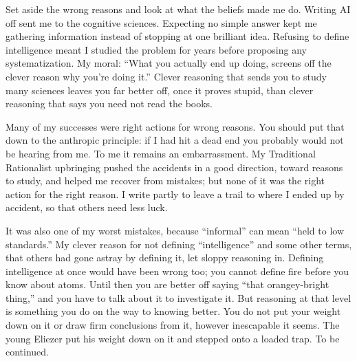 Set aside the wrong reasons and look at what the beliefs made me do. Writing AI off sent me to the cognitive sciences. Expecting no simple answer kept me gathering information instead of stopping at one brilliant idea. Refusing to define intelligence meant I studied the problem for years before proposing any systematization. My moral: ``What you actually end up doing, screens off the clever reason why you're doing it.'' Clever reasoning that sends you to study many sciences leaves you far better off, once it proves stupid, than clever reasoning that says you need not read the books.

Many of my successes were right actions for wrong reasons. You should put that down to the anthropic principle: if I had hit a dead end you probably would not be hearing from me. To me it remains an embarrassment. My Traditional Rationalist upbringing pushed the accidents in a good direction, toward reasons to study, and helped me recover from mistakes; but none of it was the right action for the right reason. I write partly to leave a trail to where I ended up by accident, so that others need less luck.

It was also one of my worst mistakes, because ``informal'' can mean ``held to low standards.'' My clever reason for not defining ``intelligence'' and some other terms, that others had gone astray by defining it, let sloppy reasoning in. Defining intelligence at once would have been wrong too; you cannot define fire before you know about atoms. Until then you are better off saying ``that orangey-bright thing,'' and you have to talk about it to investigate it. But reasoning at that level is something you do on the way to knowing better. You do not put your weight down on it or draw firm conclusions from it, however inescapable it seems. The young Eliezer put his weight down on it and stepped onto a loaded trap. To be continued. 
